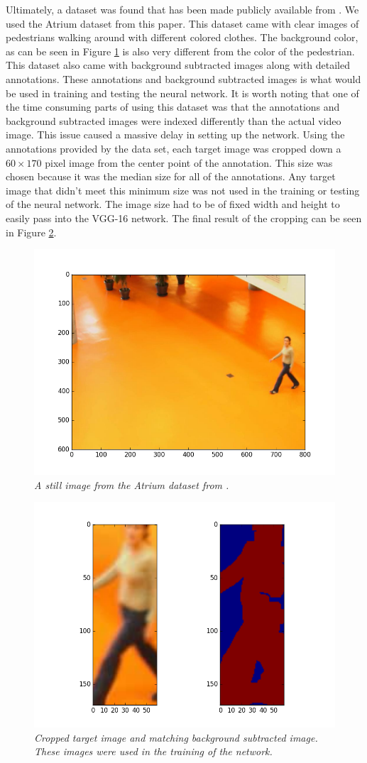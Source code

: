 \documentclass[letterpaper, 10 pt, conference]{ieeeconf}  %
\begin{document}
Ultimately, a dataset was found that has been made publicly available from \cite{jodoin2014urban}. We used the Atrium dataset from this paper. This dataset came with clear images of pedestrians walking around with different colored clothes. The background color, as can be seen in Figure \ref{fig:atrium_full} is also very different from the color of the pedestrian. This dataset also came with background subtracted images along with detailed annotations. These annotations and background subtracted images is what would be used in training and testing the neural network. It is worth noting that one of the time consuming parts of using this dataset was that the annotations and background subtracted images were indexed differently than the actual video image. This issue caused a massive delay in setting up the network. Using the annotations provided by the data set, each target image was cropped down a $60\times170$ pixel image from the center point of the annotation. This size was chosen because it was the median size for all of the annotations. Any target image that didn't meet this minimum size was not used in the training or testing of the neural network. The image size had to be of fixed width and height to easily pass into the VGG-16 network. The final result of the cropping can be seen in Figure \ref{fig:atrium_combined}.

\begin{figure}
	\begin{center}
		\includegraphics[width=.45\textwidth]{atrium_full.png}
		\caption{\textit{A still image from the Atrium dataset from \cite{jodoin2014urban}.}} 
		\label{fig:atrium_full}
	\end{center}
\end{figure}

\begin{figure}
	\begin{center}
		\includegraphics[width=.45\textwidth]{atrium_combined.png}
		\caption{\textit{Cropped target image and matching background subtracted image. These images were used in the training of the network.}} 
		\label{fig:atrium_combined}
	\end{center}
\end{figure}
\end{document}
